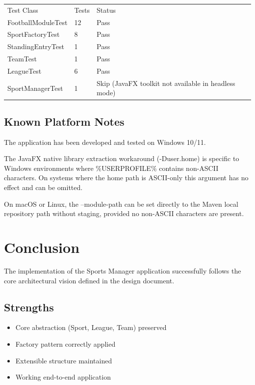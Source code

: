 \documentclass[11pt,a4paper]{article}
\begin{document}
\begin{center}
\begin{tabular}{l l l}
Test Class & Tests & Status \\
FootballModuleTest & 12 & Pass \\
SportFactoryTest & 8 & Pass \\
StandingEntryTest & 1 & Pass \\
TeamTest & 1 & Pass \\
LeagueTest & 6 & Pass \\
SportManagerTest & 1 & Skip (JavaFX toolkit not available in headless mode) \\
\end{tabular}
\end{center}

\subsection*{Known Platform Notes}

The application has been developed and tested on Windows 10/11.

The JavaFX native library extraction workaround (-Duser.home) is specific to Windows environments where \%USERPROFILE\% contains non-ASCII characters. On systems where the home path is ASCII-only this argument has no effect and can be omitted.

On macOS or Linux, the --module-path can be set directly to the Maven local repository path without staging, provided no non-ASCII characters are present.

\section{Conclusion}

The implementation of the Sports Manager application successfully follows the core architectural vision defined in the design document.

\subsection*{Strengths}

\begin{itemize}
\renewcommand{\labelitemi}{$\bullet$}
\item Core abstraction (Sport, League, Team) preserved
\item Factory pattern correctly applied
\item Extensible structure maintained
\item Working end-to-end application
\end{itemize}
\end{document}
